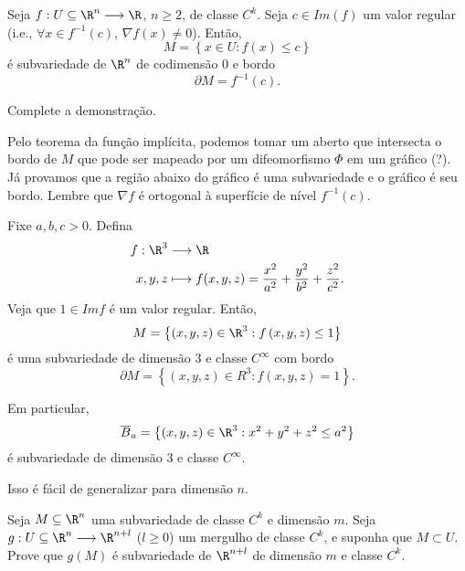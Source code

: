 \begin{prop}
    Seja $f : U\subseteq\R^{n} \longrightarrow \R$, $n\ge 2$, de classe $C^{k}$. Seja $c\in Im\left( f \right) $ um valor regular (i.e., $\forall x\in f^{-1}\left( c \right) $, $\nabla f\left( x \right) \neq 0$). Então, \[
    M = \left\{ x \in U : f\left( x \right) \le c \right\} 
    \] é subvariedade de $\R^{n}$ de codimensão 0 e bordo \[
    \partial M = f^{-1}\left( c \right) 
    .\] 
\end{prop}
\begin{demo}
    \begin{problem}
	Complete a demonstração.
    \end{problem}

    Pelo teorema da função implícita, podemos tomar um aberto que intersecta o bordo de $M$ que pode ser mapeado por um difeomorfismo $\Phi$ em um gráfico (?). Já provamos que a região abaixo do gráfico é uma subvariedade e o gráfico é seu bordo. Lembre que $\nabla f$ é ortogonal à superfície de nível $f^{-1} \left( c \right) $.
\end{demo}

\begin{eg}
    Fixe $a,b,c > 0$. Defina
    \begin{align*}
        f: \R^3 &\longrightarrow \R \\
        x,y,z &\longmapsto f(x,y,z) = \frac{x^2}{a^2} + \frac{y^2}{b^2} + \frac{z^2}{c^2}
    .\end{align*}
    Veja que $1 \in Im f$ é um valor regular. Então, \[
    M = \left\{ \left( x,y,z \right) \in \R^3 : f\left( x,y,z \right) \le 1 \right\} 
    \] é uma subvariedade de dimensão $3$ e classe $C^{\infty}$ com bordo \[
    \partial M = \left\{ \left( x,y,z \right) \in R^3 : f\left( x,y,z \right) = 1 \right\} 
    .\]

    Em particular, \[
    \overline{B}_a = \left\{ \left( x,y,z \right) \in \R^3 : x^2 + y^2 + z^2 \le a^2 \right\} 
    \] é subvariedade de dimensão 3 e classe $C^{\infty}$.

    Isso é fácil de generalizar para dimensão $n$.
\end{eg}

\begin{problem}
    Seja $M\subseteq \R^{n}$ uma subvariedade de classe $C^{k}$ e dimensão $m$. Seja $g: U\subseteq\R^{n} \longrightarrow \R^{n+l}$ ($l\ge 0$) um mergulho de classe $C^{k}$, e suponha que $M \subset U$. Prove que $g\left( M \right)$ é subvariedade de $\R^{n+l}$ de dimensão $m$ e classe $C^{k}$.
\end{problem}

